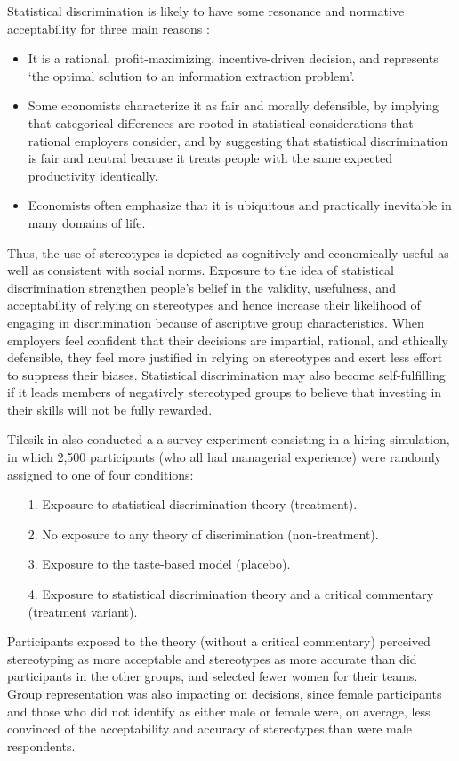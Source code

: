 Statistical discrimination is likely to have some resonance and normative acceptability for three main reasons \cite{tilcsik2021statistical}:
\begin{itemize}
\item It is a rational, profit-maximizing, incentive-driven decision, and represents `the optimal solution to an information extraction problem'.
\item Some economists characterize it as fair and morally defensible, by implying that categorical differences are rooted in statistical considerations that rational employers consider, and by suggesting that statistical discrimination is fair and neutral because it treats people with the same expected productivity identically.
\item Economists often emphasize that it is ubiquitous and practically inevitable in many domains of life.
\end{itemize}
Thus, the use of stereotypes is depicted as cognitively and economically useful as well as consistent with social norms. Exposure to the idea of statistical discrimination strengthen people's belief in the validity, usefulness, and acceptability of relying on stereotypes and hence increase their likelihood of engaging in discrimination because of ascriptive group characteristics. When employers feel confident that their decisions are impartial, rational, and ethically defensible, they feel more justified in relying on stereotypes and exert less effort to suppress their biases. Statistical discrimination may also become self-fulfilling if it leads members of negatively stereotyped groups to believe that investing in their skills will not be fully rewarded.

Tilcsik in \cite{tilcsik2021statistical} also conducted a a survey experiment consisting in a hiring simulation, in which 2,500 participants (who all had managerial experience) were randomly assigned to one of four conditions:
\begin{itemize}
\item[1.] Exposure to statistical discrimination theory (treatment).
\item[2.] No exposure to any theory of discrimination (non-treatment).
\item[3.] Exposure to the taste-based model (placebo).
\item[4.] Exposure to statistical discrimination theory and a critical commentary (treatment variant).
\end{itemize}
Participants exposed to the theory (without a critical commentary) perceived stereotyping as more acceptable and stereotypes as more accurate than did participants in the other groups, and selected fewer women for their teams. Group representation was also impacting on decisions, since female participants and those who did not identify as either male or female were, on average, less convinced of the acceptability and accuracy of stereotypes than were male respondents.

